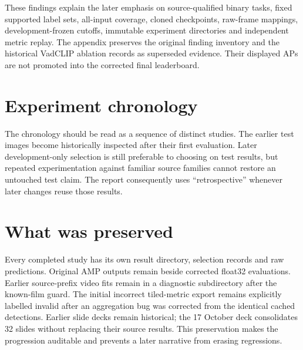 These findings explain the later emphasis on source-qualified binary tasks, fixed supported label sets, all-input coverage, cloned checkpoints, raw-frame mappings, development-frozen cutoffs, immutable experiment directories and independent metric replay. The appendix preserves the original finding inventory and the historical VadCLIP ablation records as superseded evidence. Their displayed APs are not promoted into the corrected final leaderboard.

\section{Experiment chronology}

The chronology should be read as a sequence of distinct studies. The earlier test images become historically inspected after their first evaluation. Later development-only selection is still preferable to choosing on test results, but repeated experimentation against familiar source families cannot restore an untouched test claim. The report consequently uses ``retrospective'' whenever later changes reuse those results.

\section{What was preserved}
Every completed study has its own result directory, selection records and raw predictions. Original AMP outputs remain beside corrected float32 evaluations. Earlier source-prefix video fits remain in a diagnostic subdirectory after the known-film guard. The initial incorrect tiled-metric export remains explicitly labelled invalid after an aggregation bug was corrected from the identical cached detections. Earlier slide decks remain historical; the 17 October deck consolidates 32 slides without replacing their source results. This preservation makes the progression auditable and prevents a later narrative from erasing regressions.
